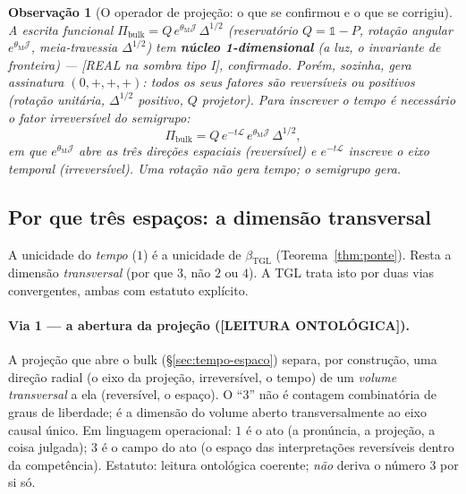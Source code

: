 \documentclass[11pt,a4paper]{article}
\newcommand{\SOMBRA}{\textsf{[REAL na sombra tipo I]}}
\newcommand{\ONTO}{\textsf{[LEITURA ONTOLÓGICA]}}
\newcommand{\bTGL}{\beta_{\mathrm{TGL}}}
\newcommand{\thM}{\theta_{\mathrm M}}
\newtheorem{remark}{Observação}
\begin{document}
\begin{remark}[O operador de projeção: o que se confirmou e o que se corrigiu]
A escrita funcional $\Pi_{\mathrm{bulk}}=Q\,e^{\thM\mathcal J}\,\Delta^{1/2}$
(reservatório $Q=\mathbb 1-P$, rotação angular $e^{\thM\mathcal J}$,
meia-travessia $\Delta^{1/2}$) tem \textbf{núcleo 1-dimensional} (a luz, o
invariante de fronteira) --- \SOMBRA, confirmado. Porém, sozinha, gera
assinatura $(0,+,+,+)$: \emph{todos os seus fatores são reversíveis ou
positivos} (rotação unitária, $\Delta^{1/2}$ positivo, $Q$ projetor). Para
inscrever o tempo é necessário o \emph{fator irreversível} do semigrupo:
\begin{equation}
\Pi_{\mathrm{bulk}}=Q\,e^{-t\mathcal L}\,e^{\thM\mathcal J}\,\Delta^{1/2},
\end{equation}
em que $e^{\thM\mathcal J}$ abre as três direções espaciais (reversível) e
$e^{-t\mathcal L}$ inscreve o eixo temporal (irreversível). \emph{Uma rotação
não gera tempo; o semigrupo gera.}
\end{remark}

\subsection{Por que três espaços: a dimensão transversal}\label{sec:tres}
A unicidade do \emph{tempo} ($1$) é a unicidade de $\bTGL$
(Teorema~\ref{thm:ponte}). Resta a dimensão \emph{transversal} (por que $3$,
não $2$ ou $4$). A TGL trata isto por duas vias convergentes, ambas com
estatuto explícito.

\paragraph{Via 1 --- a abertura da projeção (\ONTO).}
A projeção que abre o bulk (\S\ref{sec:tempo-espaco}) separa, por
construção, uma direção radial (o eixo da projeção, irreversível, o tempo) de
um \emph{volume transversal} a ela (reversível, o espaço). O ``3'' não é
contagem combinatória de graus de liberdade; é a dimensão do volume aberto
transversalmente ao eixo causal único. Em linguagem operacional: $1$ é o ato
(a pronúncia, a projeção, a coisa julgada); $3$ é o campo do ato (o espaço
das interpretações reversíveis dentro da competência). Estatuto: leitura
ontológica coerente; \emph{não} deriva o número $3$ por si só.
\end{document}
